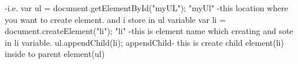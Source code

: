       -i.e. var ul = document.getElementById("myUL");
                  "myUl" -this location where you want to create element. and i store in ul variable
            var li = document.createElement("li");
                  "li" -this is element name which creating and sote in li variable.
            ul.appendChild(li); 
                  appendChild- this is create child element(li) inside to  parent element(ul)


